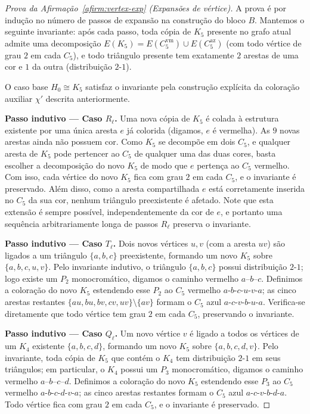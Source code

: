 \documentclass[reqno, 12pt]{amsart}
\numberwithin{equation}{section}
\theoremstyle{plain}
\theoremstyle{definition}
\begin{document}
\begin{proof}[Prova da Afirmação~\ref{afirm:vertex-exp} (Expansões de vértice)]
A prova é por indução no número de passos de expansão na construção do bloco $B$.
Mantemos o seguinte invariante: após cada passo, toda cópia de $K_5$ presente no grafo
atual admite uma decomposição $E(K_5) = E(C_5^{\text{vm}}) \cup E(C_5^{\text{az}})$
(com todo vértice de grau $2$ em cada $C_5$), e todo triângulo presente tem exatamente
$2$ arestas de uma cor e $1$ da outra (distribuição $2$-$1$).

\medskip

O caso base $H_0 \cong K_5$ satisfaz o invariante pela construção explícita da coloração
auxiliar $\chi'$ descrita anteriormente.

\medskip\noindent\textbf{Passo indutivo --- Caso $R_\ell$.}
Uma nova cópia de $K_5$ é colada à estrutura existente por uma única aresta $e$ já colorida
(digamos, $e$ é vermelha). As $9$ novas arestas ainda não possuem cor.
Como $K_5$ se decompõe em dois $C_5$, e qualquer aresta de $K_5$ pode pertencer ao $C_5$
de qualquer uma das duas cores, basta escolher a decomposição do novo $K_5$ de modo que
$e$ pertença ao $C_5$ vermelho. Com isso, cada vértice do novo $K_5$ fica com grau $2$
em cada $C_5$, e o invariante é preservado. Além disso, como a aresta compartilhada $e$
está corretamente inserida no $C_5$ da sua cor, nenhum triângulo preexistente é afetado.
Note que esta extensão é sempre possível, independentemente da cor de $e$, e portanto
uma sequência arbitrariamente longa de passos $R_\ell$ preserva o invariante.

\medskip\noindent\textbf{Passo indutivo --- Caso $T_\ell$.}
Dois novos vértices $u, v$ (com a aresta $uv$) são ligados a um triângulo $\{a,b,c\}$
preexistente, formando um novo $K_5$ sobre $\{a,b,c,u,v\}$.
Pelo invariante indutivo, o triângulo $\{a,b,c\}$ possui distribuição $2$-$1$;
logo existe um $P_2$ monocromático, digamos o caminho vermelho $a$--$b$--$c$.
Definimos a coloração do novo $K_5$ estendendo esse $P_2$ ao $C_5$ vermelho
$a\text{-}b\text{-}c\text{-}u\text{-}v\text{-}a$; as cinco arestas restantes
$\{au, bu, bv, cv, uv\} \setminus \{av\}$
formam o $C_5$ azul $a\text{-}c\text{-}v\text{-}b\text{-}u\text{-}a$.
Verifica-se diretamente que todo vértice tem grau $2$ em cada $C_5$, preservando o invariante.

\medskip\noindent\textbf{Passo indutivo --- Caso $Q_\ell$.}
Um novo vértice $v$ é ligado a todos os vértices de um $K_4$ existente $\{a,b,c,d\}$,
formando um novo $K_5$ sobre $\{a,b,c,d,v\}$.
Pelo invariante, toda cópia de $K_5$ que contém o $K_4$ tem distribuição $2$-$1$ em seus
triângulos; em particular, o $K_4$ possui um $P_3$ monocromático, digamos o caminho
vermelho $a$--$b$--$c$--$d$.
Definimos a coloração do novo $K_5$ estendendo esse $P_3$ ao $C_5$ vermelho
$a\text{-}b\text{-}c\text{-}d\text{-}v\text{-}a$; as cinco arestas restantes formam
o $C_5$ azul $a\text{-}c\text{-}v\text{-}b\text{-}d\text{-}a$.
Todo vértice fica com grau $2$ em cada $C_5$, e o invariante é preservado.
\end{proof}
\end{document}
